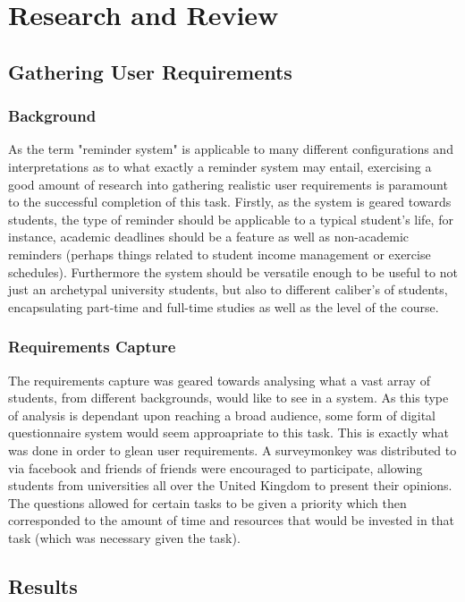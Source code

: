 \documentclass[12pt]{article} %
\begin{document}
\newpage
\tableofcontents
\newpage

\section{Research and Review}
\subsection{Gathering User Requirements}

\subsubsection{Background}
As the term "reminder system" is applicable to many different configurations and interpretations as to what exactly a reminder system may entail, exercising a good amount of research into gathering realistic user requirements is paramount to the successful completion of this task. Firstly, as the system is geared towards students, the type of reminder should be applicable to a typical student's life, for instance, academic deadlines should be a feature as well as non-academic reminders (perhaps things related to student income management or exercise schedules). Furthermore the system should be versatile enough to be useful to not just an archetypal university students, but also to different caliber's of students, encapsulating part-time and full-time studies as well as the level of the course.
\subsubsection{Requirements Capture}
The requirements capture was geared towards analysing what a vast array of students, from different backgrounds, would like to see in a system. As this type of analysis is dependant upon reaching a broad audience, some form of digital questionnaire system would seem approapriate to this task. This is exactly what was done in order to glean user requirements. A surveymonkey was distributed to via facebook and friends of friends were encouraged to participate, allowing students from universities all over the United Kingdom to present their opinions. The questions allowed for certain tasks to be given a priority which then corresponded to the amount of time and resources that would be invested in that task (which was necessary given the task).

\subsection{Results}
\end{document}
